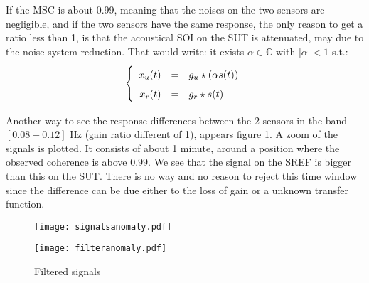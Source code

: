 If the MSC is about 0.99, meaning that the noises on the two sensors are negligible, and if the two sensors have the same response, the only reason to get a ratio less than 1, is that the acoustical SOI on the SUT is attenuated, may due to the noise system reduction. That would write: it exists $\alpha\in\mathbb{C}$ with $|\alpha|<1$ s.t.:
\begin{eqnarray}
\label{eq:model-of-obervation}
\left\{
\renewcommand\arraystretch{1.6}
\begin{array}{rcl}
x_{\ut}(t)&=&g_{\ut}  \star (\alpha s(t))
\\
x_{\rf}(t)&=&g_{\rf}  \star s(t)
\end{array}
\right.
\end{eqnarray}



Another way to see the response differences between the 2 sensors in the band  $[0.08-0.12]$ Hz (gain ratio different of 1), appears figure \ref{fig:filteredsignals}. A zoom of the signals is plotted. It consists of about 1 minute, around a position where the observed coherence is above $0.99$. We see that the signal on the SREF  is bigger than this on the SUT. There is no way and no reason to reject this time window since the difference can be due either to the loss of gain or a unknown transfer function. 
\begin{figure}%
\begin{minipage}{10cm}
              \texttt{[image: signalsanomaly.pdf]}
\end{minipage}
\begin{minipage}[c]{8cm}
              \texttt{[image: filteranomaly.pdf]}    

\end{minipage}
\centering
\caption{Filtered signals}
\label{fig:filteredsignals}
\end{figure}

